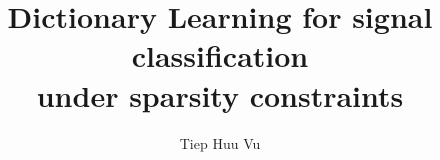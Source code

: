 \documentclass[phd,11pt]{psuthesis}
\title{Dictionary Learning for signal classification \\ under sparsity constraints}
\author{Tiep Huu Vu}
\begin{document}
\frontmatter

%


\psutitlepage

\psucommitteepage


\thesistableofcontents








\thesismainmatter
\end{document}
